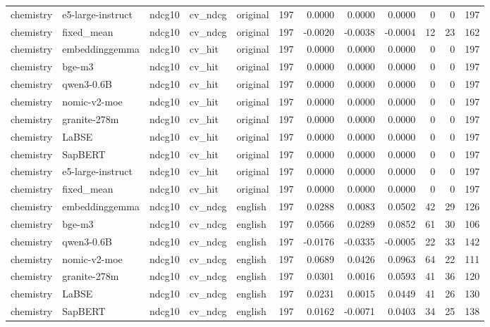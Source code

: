 \begin{tabular}{lllllrrrrrrr}
chemistry & e5-large-instruct & ndcg10 & cv\_ndcg & original & 197 & 0.0000 & 0.0000 & 0.0000 & 0 & 0 & 197 \\
chemistry & fixed\_mean & ndcg10 & cv\_ndcg & original & 197 & -0.0020 & -0.0038 & -0.0004 & 12 & 23 & 162 \\
chemistry & embeddinggemma & ndcg10 & cv\_hit & original & 197 & 0.0000 & 0.0000 & 0.0000 & 0 & 0 & 197 \\
chemistry & bge-m3 & ndcg10 & cv\_hit & original & 197 & 0.0000 & 0.0000 & 0.0000 & 0 & 0 & 197 \\
chemistry & qwen3-0.6B & ndcg10 & cv\_hit & original & 197 & 0.0000 & 0.0000 & 0.0000 & 0 & 0 & 197 \\
chemistry & nomic-v2-moe & ndcg10 & cv\_hit & original & 197 & 0.0000 & 0.0000 & 0.0000 & 0 & 0 & 197 \\
chemistry & granite-278m & ndcg10 & cv\_hit & original & 197 & 0.0000 & 0.0000 & 0.0000 & 0 & 0 & 197 \\
chemistry & LaBSE & ndcg10 & cv\_hit & original & 197 & 0.0000 & 0.0000 & 0.0000 & 0 & 0 & 197 \\
chemistry & SapBERT & ndcg10 & cv\_hit & original & 197 & 0.0000 & 0.0000 & 0.0000 & 0 & 0 & 197 \\
chemistry & e5-large-instruct & ndcg10 & cv\_hit & original & 197 & 0.0000 & 0.0000 & 0.0000 & 0 & 0 & 197 \\
chemistry & fixed\_mean & ndcg10 & cv\_hit & original & 197 & 0.0000 & 0.0000 & 0.0000 & 0 & 0 & 197 \\
chemistry & embeddinggemma & ndcg10 & cv\_ndcg & english & 197 & 0.0288 & 0.0083 & 0.0502 & 42 & 29 & 126 \\
chemistry & bge-m3 & ndcg10 & cv\_ndcg & english & 197 & 0.0566 & 0.0289 & 0.0852 & 61 & 30 & 106 \\
chemistry & qwen3-0.6B & ndcg10 & cv\_ndcg & english & 197 & -0.0176 & -0.0335 & -0.0005 & 22 & 33 & 142 \\
chemistry & nomic-v2-moe & ndcg10 & cv\_ndcg & english & 197 & 0.0689 & 0.0426 & 0.0963 & 64 & 22 & 111 \\
chemistry & granite-278m & ndcg10 & cv\_ndcg & english & 197 & 0.0301 & 0.0016 & 0.0593 & 41 & 36 & 120 \\
chemistry & LaBSE & ndcg10 & cv\_ndcg & english & 197 & 0.0231 & 0.0015 & 0.0449 & 41 & 26 & 130 \\
chemistry & SapBERT & ndcg10 & cv\_ndcg & english & 197 & 0.0162 & -0.0071 & 0.0403 & 34 & 25 & 138 \\

\end{tabular}
